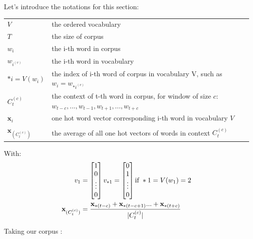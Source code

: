 Let's introduce the notations for this section:

{\ttfamily
\begin{table}[H]
    \centering
    \begin{tabular}{ll}
        \toprule
        $V$       	   	 &    the ordered vocabulary \\
        $T$    		   	 &    the size of corpus \\
        $w_i$          	 &    the i-th word in corpus \\
        $w_{i^{(v)}}$          	 &    the i-th word in vocabulary \\
        $*i = V(w_{i})$       &    the index of i-th word of corpus in vocabulary V, such as $ w_{i} = w_{*i^{(v)}}$\\
        $C_t^{(c)}$      &    the context of t-th word in corpus, for window of size $c$: $w_{t-c}, ..., w_{t-1}, w_{t+1}, ... ,w_{t+c}$\\
		$\mathbf{x}_i$ 				& one hot word vector corresponding i-th word in vocabulary $V$ \\
        $\mathbf{x}_{(C_t^{(c)})}$ 	& the average of all one hot vectors of words in context $C_t^{(c)}$ \\
        \bottomrule
    \end{tabular}
\end{table}
}

With:
\begin{align}
	v_1 &= 
	\begin{bmatrix} 
		1 \\
		0 \\
		\vdots\\
		0
	\end{bmatrix}
	v_{*1} = 
	\begin{bmatrix} 
		0 \\
		1 \\
		\vdots\\
		0
	\end{bmatrix}
	\textnormal{if } *1 = V(w_1) = 2\\
	\mathbf{x}_{(C_t^{(c)})} &= \frac{\mathbf{x}_{*(t-c)} + \mathbf{x}_{*(t-c+1)} ... + \mathbf{x}_{*(t+c)}}{|C_t^{(c)}|}
\end{align}

Taking our corpus :

